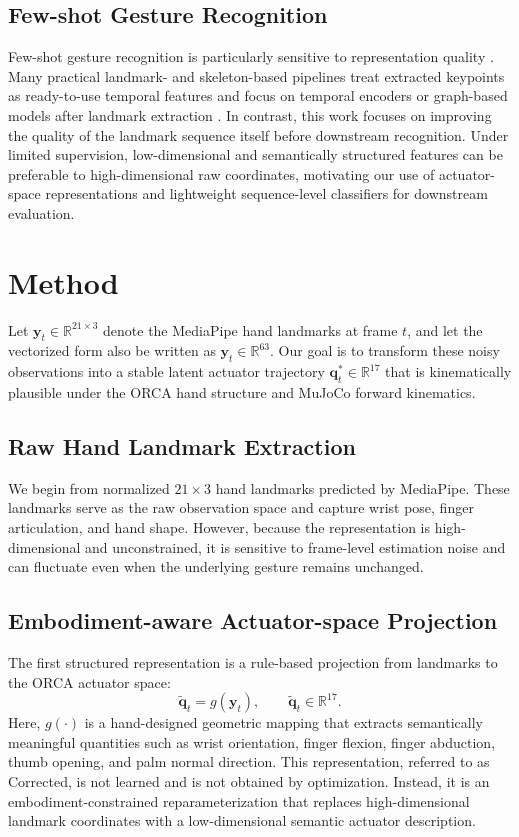 \documentclass[11pt]{article}
\begin{document}
\subsection{Few-shot Gesture Recognition}
Few-shot gesture recognition is particularly sensitive to representation quality \cite{vinyals2016matching,snell2017prototypical}. Many practical landmark- and skeleton-based pipelines treat extracted keypoints as ready-to-use temporal features and focus on temporal encoders or graph-based models after landmark extraction \cite{du2015hierarchical,yan2018stgcn,shi2019twostream}. In contrast, this work focuses on improving the quality of the landmark sequence itself before downstream recognition. Under limited supervision, low-dimensional and semantically structured features can be preferable to high-dimensional raw coordinates, motivating our use of actuator-space representations and lightweight sequence-level classifiers for downstream evaluation.

\section{Method}
Let $\mathbf{y}_t \in \mathbb{R}^{21 \times 3}$ denote the MediaPipe hand landmarks at frame $t$, and let the vectorized form also be written as $\mathbf{y}_t \in \mathbb{R}^{63}$. Our goal is to transform these noisy observations into a stable latent actuator trajectory $\mathbf{q}_t^* \in \mathbb{R}^{17}$ that is kinematically plausible under the ORCA hand structure and MuJoCo forward kinematics.

\subsection{Raw Hand Landmark Extraction}
We begin from normalized $21 \times 3$ hand landmarks predicted by MediaPipe. These landmarks serve as the raw observation space and capture wrist pose, finger articulation, and hand shape. However, because the representation is high-dimensional and unconstrained, it is sensitive to frame-level estimation noise and can fluctuate even when the underlying gesture remains unchanged.

\subsection{Embodiment-aware Actuator-space Projection}
The first structured representation is a rule-based projection from landmarks to the ORCA actuator space:
\[
\tilde{\mathbf{q}}_t = g(\mathbf{y}_t), \qquad \tilde{\mathbf{q}}_t \in \mathbb{R}^{17}.
\]
Here, $g(\cdot)$ is a hand-designed geometric mapping that extracts semantically meaningful quantities such as wrist orientation, finger flexion, finger abduction, thumb opening, and palm normal direction. This representation, referred to as Corrected, is not learned and is not obtained by optimization. Instead, it is an embodiment-constrained reparameterization that replaces high-dimensional landmark coordinates with a low-dimensional semantic actuator description.
\end{document}

